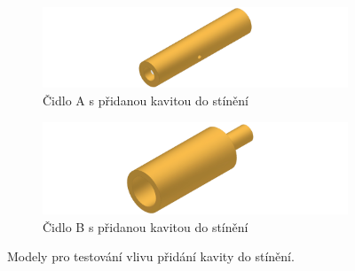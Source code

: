         \begin{figure}[ht!]
            \centering
            \begin{subfigure}{0.45\textwidth}
                \centering
                \includegraphics[width=\textwidth]{400_SIMULACE_KONSTRUKCNICH_UPRAV/Vykresy_rendery/Kavita.png}
                \caption{Čidlo A s přidanou kavitou do stínění}
                \label{fig:kavita-A}
            \end{subfigure}
            \begin{subfigure}{0.45\textwidth}
                \centering
                \includegraphics[width=\textwidth]{400_SIMULACE_KONSTRUKCNICH_UPRAV/Vykresy_rendery/Kavita_B.png}
                \caption{Čidlo B s přidanou kavitou do stínění}
                \label{fig:kavita-B}
            \end{subfigure}
            \caption{Modely pro testování vlivu přidání kavity do stínění.}
            \label{fig:kavita-modely}
        \end{figure}
        
